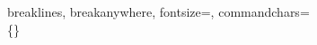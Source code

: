 \usepackage{fancyvrb}
\usepackage{fvextra}
\usepackage{geometry}
\usepackage{titlesec}
\usepackage{longtable}
\usepackage{caption}
\usepackage{fontspec}
\setmainfont{TeX Gyre Termes}

{breaklines, breakanywhere, fontsize=\small, commandchars=\\\{\}}


\captionsetup[table]{skip=10pt}

